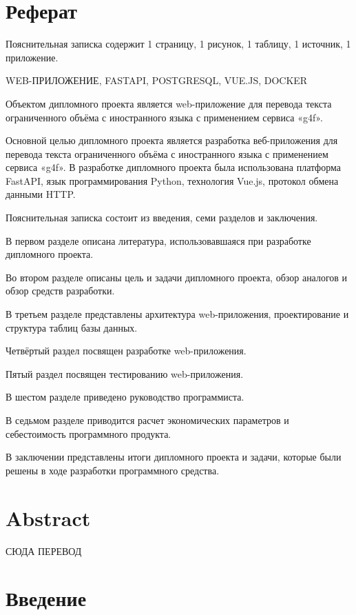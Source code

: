 \documentclass[14pt]{extarticle}
\begin{document}
\clearpage
\section*{Реферат}
Пояснительная записка содержит 1 страницу, 1 рисунок, 1 таблицу,
1 источник, 1 приложение. 

WEB-ПРИЛОЖЕНИЕ, FASTAPI, POSTGRESQL, VUE.JS, DOCKER

Объектом дипломного проекта является web-приложение для перевода текста ограниченного объёма с иностранного языка с применением сервиса «g4f».

Основной целью дипломного проекта является разработка веб-приложения для перевода текста ограниченного объёма с иностранного языка с применением сервиса «g4f». В разработке дипломного проекта была использована платформа FastAPI, язык программирования Python, технология Vue.js, протокол обмена данными HTTP.

Пояснительная записка состоит из введения, семи разделов и заключения.

В первом разделе описана литература, использовавшаяся при разработке дипломного проекта.

Во втором разделе описаны цель и задачи дипломного проекта, обзор аналогов и обзор средств разработки.

В третьем разделе представлены архитектура web-приложения, проектирование и структура таблиц базы данных.

Четвёртый раздел посвящен разработке web-приложения.

Пятый раздел посвящен тестированию web-приложения.

В шестом разделе приведено руководство программиста.

В седьмом разделе приводится расчет экономических параметров и себестоимость программного продукта.

В заключении представлены итоги дипломного проекта и задачи, которые были решены в ходе разработки программного средства.

\clearpage
\section*{Abstract}
СЮДА ПЕРЕВОД

\clearpage
\tableofcontents

\clearpage
\section*{Введение}
\end{document}
